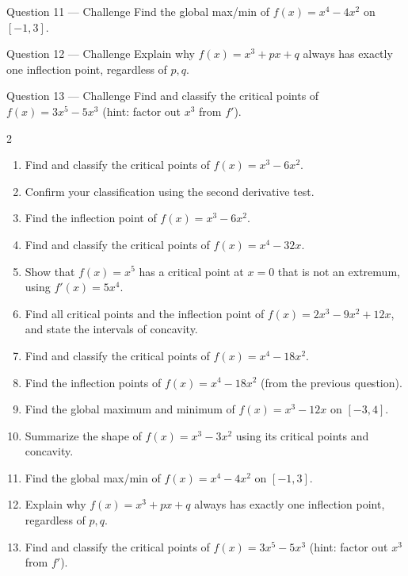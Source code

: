 \documentclass[11pt]{article}
\begin{document}
\begin{qbox}{Question 11 --- Challenge}
Find the global max/min of $f(x)=x^4-4x^2$ on $[-1,3]$.\workspace{3.4cm}
\end{qbox}

\begin{qbox}{Question 12 --- Challenge}
Explain why $f(x)=x^3+px+q$ always has exactly one inflection point, regardless of $p,q$.\workspace{3cm}
\end{qbox}

\begin{qbox}{Question 13 --- Challenge}
Find and classify the critical points of $f(x)=3x^5-5x^3$ (hint: factor out $x^3$ from $f'$).\workspace{3.4cm}
\end{qbox}

\clearpage
{}

\begin{recapbox}
\begin{multicols}{2}
\small
\begin{enumerate}[leftmargin=*,itemsep=3pt]
  \item Find and classify the critical points of $f(x)=x^3-6x^2$.
  \item Confirm your classification using the second derivative test.
  \item Find the inflection point of $f(x)=x^3-6x^2$.
  \item Find and classify the critical points of $f(x)=x^4-32x$.
  \item Show that $f(x)=x^5$ has a critical point at $x=0$ that is not an extremum, using $f'(x)=5x^4$.
  \item Find all critical points and the inflection point of $f(x)=2x^3-9x^2+12x$, and state the intervals of concavity.
  \item Find and classify the critical points of $f(x)=x^4-18x^2$.
  \item Find the inflection points of $f(x)=x^4-18x^2$ (from the previous question).
  \item Find the global maximum and minimum of $f(x)=x^3-12x$ on $[-3,4]$.
  \item Summarize the shape of $f(x)=x^3-3x^2$ using its critical points and concavity.
  \item Find the global max/min of $f(x)=x^4-4x^2$ on $[-1,3]$.
  \item Explain why $f(x)=x^3+px+q$ always has exactly one inflection point, regardless of $p,q$.
  \item Find and classify the critical points of $f(x)=3x^5-5x^3$ (hint: factor out $x^3$ from $f'$).
\end{enumerate}
\end{multicols}
\end{recapbox}
\end{document}
